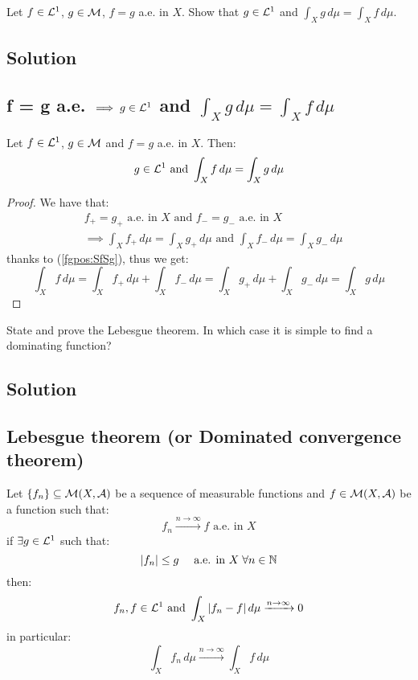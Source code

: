 
\question
Let $f \in \mathcal{L}^1$, $g \in \mathcal{M}$, $f = g$ a.e. in $X$. Show that $g \in \mathcal{L}^1$ and $\int_X g\, d\mu = \int_X f \, d\mu$.

\subsection*{Solution}

\subsection{f = g a.e. \texorpdfstring{$\implies g \in \mathcal{L}^1$}{then g is integrable} and \texorpdfstring{$\int_X g\, d\mu = \int_X f \, d\mu$}{its integral is the same as f}}
Let $f\in\mathcal{L}^1$, $g\in\mathcal{M}$ and $f=g$ a.e. in $X$. Then:
\[
    g \in \mathcal{L}^1 \text{ and } \int_X f \, d\mu = \int_X g \, d\mu
\]

\begin{proof}
    We have that:
    \begin{align*}
        & f_+=g_+ \text{ a.e. in } X  \text{ and } f_-=g_- \text{ a.e. in } X \\
        & \implies \int_X f_+ \, d\mu = \int_X g_+ \, d\mu \text{ and } \int_X f_- \, d\mu = \int_X g_- \, d\mu
    \end{align*}
    thanks to (\ref{fgpos:SfSg}), thus we get:
    \[
        \int_X f \, d\mu = \int_X f_+ \, d\mu + \int_X f_- \, d\mu = \int_X g_+ \, d\mu + \int_X g_- \, d\mu = \int_X g \, d\mu
    \]
\end{proof}


\question
State and prove the Lebesgue theorem. In which case it is simple to find a dominating function?


\subsection*{Solution}

\subsection{Lebesgue theorem (or Dominated convergence theorem)}\label{DCT}
Let $\{ f_n \}\subseteq \mathcal{M}(X,\mathcal{A})$ be a sequence of measurable functions and $f\in\mathcal{M}(X,\mathcal{A})$ be a function such that:
\[
    f_n \xrightarrow{n\to\infty} f \text{ a.e. in } X
\]
if $\exists g \in \mathcal{L}^1$ such that:
\[
    |f_n| \leq g \quad \text{ a.e. in } X \; \forall n \in \mathbb{N}
\]
then:
\[
    f_n,f \in \mathcal{L}^1 \text{ and } \int_X |f_n-f| \, d\mu \xrightarrow{n\to\infty} 0    
\]
in particular:
\[
    \int_X f_n \, d\mu \xrightarrow{n\to\infty} \int_X f \, d\mu
\]

